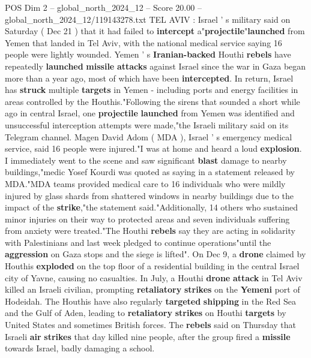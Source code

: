 \begin{textsample}{POS Dim 2 – global\_north\_2024\_12 – Score 20.00 – global\_north\_2024\_12/119143278.txt}  \label{ex:f2_pos_277}
TEL AVIV : Israel ' s military said on Saturday ( Dec 21 ) that it had failed to \textbf{intercept} a"\textbf{projectile}"\textbf{launched} from Yemen that landed in Tel Aviv, with the national medical service saying 16 people were lightly wounded.
Yemen ' s \textbf{Iranian-backed} Houthi \textbf{rebels} have repeatedly \textbf{launched} \textbf{missile} \textbf{attacks} against Israel since the war in Gaza began more than a year ago, most of which have been \textbf{intercepted}.
In return, Israel has \textbf{struck} multiple \textbf{targets} in Yemen - including ports and energy facilities in areas controlled by the Houthis."Following the sirens that sounded a short while ago in central Israel, one \textbf{projectile} \textbf{launched} from Yemen was identified and unsuccessful interception attempts were made,"the Israeli military said on its Telegram channel.
Magen David Adom ( MDA ), Israel ' s emergency medical service, said 16 people were injured."I was at home and heard a loud \textbf{explosion}.
I immediately went to the scene and saw significant \textbf{blast} damage to nearby buildings,"medic Yosef Kourdi was quoted as saying in a statement released by MDA."MDA teams provided medical care to 16 individuals who were mildly injured by glass shards from shattered windows in nearby buildings due to the impact of the \textbf{strike},"the statement said."Additionally, 14 others who sustained minor injuries on their way to protected areas and seven individuals suffering from anxiety were treated."The Houthi \textbf{rebels} say they are acting in solidarity with Palestinians and last week pledged to continue operations"until the \textbf{aggression} on Gaza stops and the siege is lifted".
On Dec 9, a \textbf{drone} claimed by Houthis \textbf{exploded} on the top floor of a residential building in the central Israel city of Yavne, causing no casualties.
In July, a Houthi \textbf{drone} \textbf{attack} in Tel Aviv killed an Israeli civilian, prompting \textbf{retaliatory} \textbf{strikes} on the \textbf{Yemeni} port of Hodeidah.
The Houthis have also regularly \textbf{targeted} \textbf{shipping} in the Red Sea and the Gulf of Aden, leading to \textbf{retaliatory} \textbf{strikes} on Houthi \textbf{targets} by United States and sometimes British forces.
The \textbf{rebels} said on Thursday that Israeli \textbf{air} \textbf{strikes} that day killed nine people, after the group fired a \textbf{missile} towards Israel, badly damaging a school.

\end{textsample}
